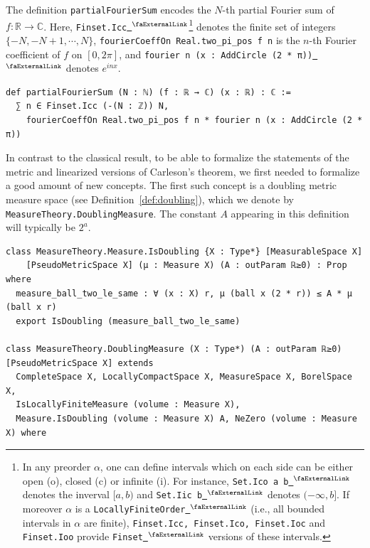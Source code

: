 \documentclass[12pt]{amsart}
\newcounter{lstlisting}[section]
\newcommand{\lean}[1]{\lstinline{#1}}
\newcommand*{\complex}{\mathbb{C}} %
\newcommand*{\real}{\mathbb{R}} %
\newcommand{\extlink}{~\ensuremath{{}^\text{\faExternalLink}}}
\theoremstyle{definition}
\theoremstyle{plain}
\begin{document}
The definition \lean{partialFourierSum} encodes the $N$-th partial Fourier sum of $f\colon\real \to\complex$. Here, \lean{Finset.Icc}\href{https://github.com/leanprover-community/mathlib4/blob/81a5d257c8e410db227a6665ed08f64fea08e997/Mathlib/Order/Interval/Finset/Defs.lean#L280}{\extlink}\footnote{In any preorder $\alpha$, one can define intervals which on each side can be either open (o), closed (c) or infinite (i). For instance, \lean{Set.Ico a b}\href{https://github.com/leanprover-community/mathlib4/blob/81a5d257c8e410db227a6665ed08f64fea08e997/Mathlib/Order/Interval/Set/Defs.lean\#L59}{\extlink} denotes the inverval $[a, b)$ and \lean{Set.Iic b}\href{https://github.com/leanprover-community/mathlib4/blob/81a5d257c8e410db227a6665ed08f64fea08e997/Mathlib/Order/Interval/Set/Defs.lean\#L44}{\extlink} denotes $(-\infty, b]$. If moreover $\alpha$ is a \lean{LocallyFiniteOrder}\href{https://github.com/leanprover-community/mathlib4/blob/81a5d257c8e410db227a6665ed08f64fea08e997/Mathlib/Order/Interval/Finset/Defs.lean\#L108}{\extlink} (i.e., all bounded intervals in $\alpha$ are finite), \lean{Finset.Icc, Finset.Ico, Finset.Ioc} and \lean{Finset.Ioo} provide \lean{Finset}\href{https://github.com/leanprover-community/mathlib4/blob/81a5d257c8e410db227a6665ed08f64fea08e997/Mathlib/Data/Finset/Defs.lean\#L72-L79}{\extlink} versions of these intervals.
} denotes the finite set of integers $\{-N, -N + 1, \cdots, N\}$, \lean{fourierCoeffOn Real.two_pi_pos f n} is the
$n$-th Fourier coefficient of $f$ on $[0, 2\pi]$, and \lean{fourier n (x : AddCircle (2 * π))}\href{https://github.com/leanprover-community/mathlib4/blob/81a5d257c8e410db227a6665ed08f64fea08e997/Mathlib/Analysis/Fourier/AddCircle.lean#L123}{\extlink} denotes $e^{inx}$.
\begin{lstlisting}[mathescape]
def partialFourierSum (N : ℕ) (f : ℝ → ℂ) (x : ℝ) : ℂ :=
  ∑ n ∈ Finset.Icc (-(N : ℤ)) N,
    fourierCoeffOn Real.two_pi_pos f n * fourier n (x : AddCircle (2 * π))
\end{lstlisting}

In contrast to the classical result, to be able to formalize the statements of the metric and linearized versions of Carleson's theorem, we first needed to formalize a good amount of new concepts.
The first such concept is a doubling metric measure space (see Definition~\ref{def:doubling}), which we denote by \lean{MeasureTheory.DoublingMeasure}. The constant $A$ appearing in this definition will typically be $2^a$.
\begin{lstlisting}[mathescape]
class MeasureTheory.Measure.IsDoubling {X : Type*} [MeasurableSpace X]
    [PseudoMetricSpace X] (μ : Measure X) (A : outParam ℝ≥0) : Prop where
  measure_ball_two_le_same : ∀ (x : X) r, μ (ball x (2 * r)) ≤ A * μ (ball x r)
  export IsDoubling (measure_ball_two_le_same)

class MeasureTheory.DoublingMeasure (X : Type*) (A : outParam ℝ≥0) [PseudoMetricSpace X] extends
  CompleteSpace X, LocallyCompactSpace X, MeasureSpace X, BorelSpace X,
  IsLocallyFiniteMeasure (volume : Measure X),
  Measure.IsDoubling (volume : Measure X) A, NeZero (volume : Measure X) where
\end{lstlisting}
\end{document}
